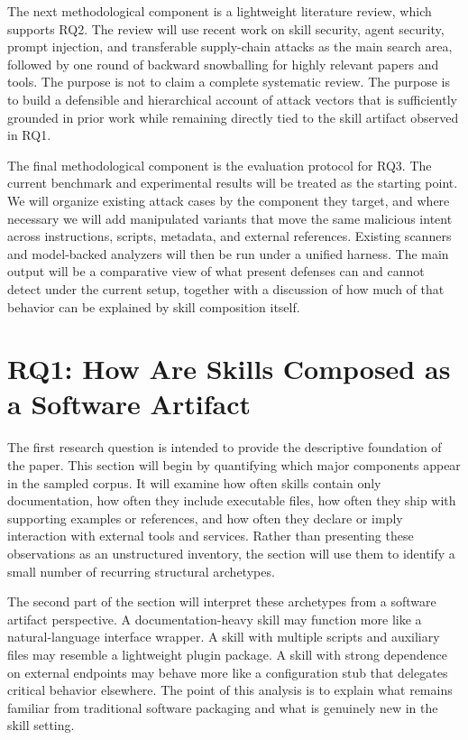 \documentclass[conference]{IEEEtran}
\begin{document}
The next methodological component is a lightweight literature review,
which supports RQ2. The review will use recent work on skill security,
agent security, prompt injection, and transferable supply-chain attacks
as the main search area, followed by one round of backward snowballing
for highly relevant papers and tools. The purpose is not to claim a
complete systematic review. The purpose is to build a defensible and
hierarchical account of attack vectors that is sufficiently grounded in
prior work while remaining directly tied to the skill artifact observed
in RQ1.

The final methodological component is the evaluation protocol for RQ3.
The current benchmark and experimental results will be treated as the
starting point. We will organize existing attack cases by the component
they target, and where necessary we will add manipulated variants that
move the same malicious intent across instructions, scripts, metadata,
and external references. Existing scanners and model-backed analyzers
will then be run under a unified harness. The main output will be a
comparative view of what present defenses can and cannot detect under
the current setup, together with a discussion of how much of that
behavior can be explained by skill composition itself.

\section{RQ1: How Are Skills Composed as a Software Artifact}

The first research question is intended to provide the descriptive
foundation of the paper. This section will begin by quantifying which
major components appear in the sampled corpus. It will examine how often
skills contain only documentation, how often they include executable
files, how often they ship with supporting examples or references, and
how often they declare or imply interaction with external tools and
services. Rather than presenting these observations as an unstructured
inventory, the section will use them to identify a small number of
recurring structural archetypes.

The second part of the section will interpret these archetypes from a
software artifact perspective. A documentation-heavy skill may function
more like a natural-language interface wrapper. A skill with multiple
scripts and auxiliary files may resemble a lightweight plugin package. A
skill with strong dependence on external endpoints may behave more like
a configuration stub that delegates critical behavior elsewhere. The
point of this analysis is to explain what remains familiar from
traditional software packaging and what is genuinely new in the skill
setting.
\end{document}

